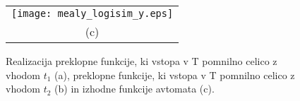 \begin{resitev}
\begin{figure}[!ht]
\begin{center}
\bigskip

\begin{tabular}{c}
\texttt{[image: mealy\_logisim\_y.eps]}\\
(c) \\
\end{tabular}
\caption{Realizacija preklopne funkcije, ki vstopa v T pomnilno celico z vhodom $t_1$ (a), preklopne funkcije, ki vstopa v T pomnilno celico z vhodom $t_2$ (b) in izhodne funkcije avtomata (c).}
\label{fig:logisim_f}
\end{center}
\end{figure}

\end{resitev}

%
%
%
%
%
%
%

